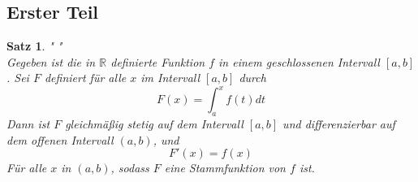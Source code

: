 \documentclass[fontsize=12pt,paper=a4,DIV12,cleardoublepage=empty, 
liststotoc,idxtotoc,bibtotoc]{article}
\newcommand{\RR}{\mathbb{R}}
\theoremstyle{plain}
\newtheorem{satz}{Satz}[subsection]
\theoremstyle{definition}
\begin{document}
	\subsection{Erster Teil}
	\begin{satz}" "\\
		Gegeben ist die in $\RR$ definierte Funktion $f$ in einem geschlossenen Intervall $[a, b]$. Sei $F$ definiert für alle $x$ im Intervall $[a, b]$ durch \\
			\begin{equation*}
				F(x)=\int_{a}^{x}f(t) dt
			\end{equation*}
		Dann ist $F$ gleichmäßig stetig auf dem Intervall $[a, b]$ und differenzierbar auf dem offenen Intervall $(a, b)$, und 
			\begin{equation*}
				F'(x)=f(x)
			\end{equation*}
		Für alle $x$ in $(a, b)$, sodass $F$ eine Stammfunktion von $f$ ist.\\\\
	
	\end{satz}
	
\end{document}
